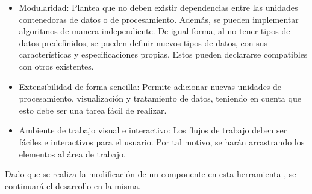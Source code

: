 \begin{itemize}
	\item Modularidad: Plantea que no deben existir dependencias entre las unidades contenedoras de datos o de procesamiento. Además, se pueden implementar algoritmos de manera independiente. De igual forma, al no tener tipos de datos predefinidos, se pueden definir nuevos tipos de datos, con sus características y especificaciones propias. Estos pueden declararse compatibles con otros existentes.
	\item	Extensibilidad de forma sencilla: Permite adicionar nuevas unidades de procesamiento, visualización y tratamiento de datos, teniendo en cuenta que esto debe ser una tarea fácil de realizar.
	\item	Ambiente de trabajo visual e interactivo: Los flujos de trabajo deben ser fáciles e interactivos para el usuario. Por tal motivo, se harán arrastrando los elementos al área de trabajo.
\end{itemize}

Dado que se realiza la modificación de un componente en esta herramienta \citep{Carrazana2022}, se continuará el desarrollo en la misma.

